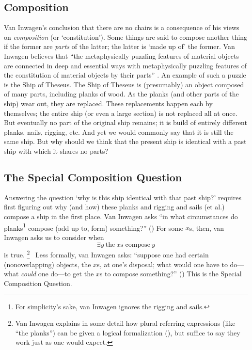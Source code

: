 \documentclass[11pt]{article}
\begin{document}
\begin{spacing}{1.5}
\subsection{Composition}
\label{comp}
Van Inwagen's conclusion that there are no chairs is a consequence of
his views on {\em composition} (or `constitution').  Some things are
said to compose another thing if the former are {\em parts} of the
latter; the latter is `made up of' the former.  Van Inwagen believes
that ``the metaphysically puzzling features of material objects are
connected in deep and essential ways with metaphysically puzzling
features of the constitution of material objects by their
parts'' \citep[18]{inwagen1995}.  An example of such a puzzle is the
Ship of Theseus.  The Ship of Theseus is (presumably) an object
composed of many parts, including planks of wood.  As the planks (and
other parts of the ship) wear out, they are replaced.  These
replacements happen each by themselves; the entire ship (or even a
large section) is not replaced all at once.  But eventually no part of
the original ship remains; it is build of entirely different planks,
nails, rigging, etc.  And yet we would commonly say that it is still
the same ship.  But why should we think that the present ship is
identical with a past ship with which it shares no parts?

\subsection{The Special Composition Question}
\label{scq}
Answering the question `why is this ship identical with that past
ship?' requires first figuring out why (and how) these planks and
rigging and sails (et al.) compose a ship in the first place.  Van
Inwagen asks ``in what circumstances do planks\footnote{For
  simplicity's sake, van Inwagen ignores the rigging and sails.}
compose (add up to, form) something?'' (\citeyear[21]{inwagen1995})
For some $x$s, then, van Inwagen asks us to consider when
\begin{displaymath}
\exists y\ \text{the}\ x\text{s compose}\ y
\end{displaymath}
is true.%
\footnote{Van Inwagen explains in some detail how plural referring
  expressions (like ``the planks'') can be given a logical
  formalization (\citeyear[23--28]{inwagen1995}), but suffice to say
  they work just as one would expect.}
%
\ Less formally, van Inwagen asks: ``suppose one had certain
(nonoverlapping) objects, the $x$s, at one's disposal; what would one
have to do---what {\em could} one do---to get the $x$s to compose
something?'' (\citeyear[31]{inwagen1995})  This is the Special
Composition Question.


\end{spacing}
\end{document}
